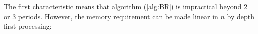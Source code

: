 \documentclass[11pt]{article}
\begin{document}
The first characteristic means that algorithm (\ref{alg:BR}) is
impractical beyond 2 or 3 periods. However, the memory requirement
can be made linear in $n$ by depth first processing:
\end{document}
